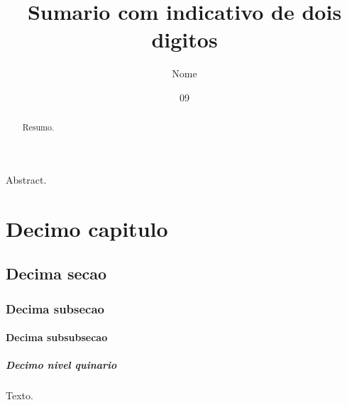 \documentclass[dsc]{ufrj}
\title{Sumario com indicativo de dois digitos}
\author{Nome}{Sobrenome}
\date{09}{2026}
\begin{document}
  \maketitle
  \frontmatter
  \begin{abstract}Resumo.\end{abstract}
  \begin{foreignabstract}Abstract.\end{foreignabstract}
  \tableofcontents
  \mainmatter
  \setcounter{chapter}{9}
  \chapter{Decimo capitulo}
  \setcounter{section}{9}
  \section{Decima secao}
  \setcounter{subsection}{9}
  \subsection{Decima subsecao}
  \setcounter{subsubsection}{9}
  \subsubsection{Decima subsubsecao}
  \setcounter{paragraph}{9}
  \paragraph{Decimo nivel quinario}
  Texto.
\end{document}
